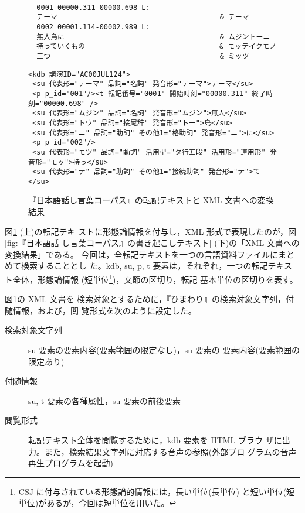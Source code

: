 \begin{figure}[hbt]

{\small
\begin{verbatim}
  
  0001 00000.311-00000.698 L:
  テーマ　　　　                                & テーマ
  0002 00001.114-00002.989 L:
  無人島に　　　                                & ムジントーニ
  持っていくもの                                & モッテイクモノ
  三つ　　　　　                                & ミッツ
\end{verbatim}}

{\small
\begin{verbatim}
<kdb 講演ID="AC00JUL124">
 <su 代表形="テーマ" 品詞="名詞" 発音形="テーマ">テーマ</su>
 <p p_id="001"/><t 転記番号="0001" 開始時刻="00000.311" 終了時刻="00000.698" />
 <su 代表形="ムジン" 品詞="名詞" 発音形="ムジン">無人</su>
 <su 代表形="トウ" 品詞="接尾辞" 発音形="トー">島</su>
 <su 代表形="ニ" 品詞="助詞" その他1="格助詞" 発音形="ニ">に</su>
 <p p_id="002"/>
 <su 代表形="モツ" 品詞="動詞" 活用型="タ行五段" 活用形="連用形" 発音形="モッ">持っ</su>
 <su 代表形="テ" 品詞="助詞" その他1="接続助詞" 発音形="テ">て</su>
\end{verbatim}}
\caption{『日本語話し言葉コーパス』の転記テキストと XML 文書への変換結果}
\label{fig:『日本語話し言葉コーパス』の書き起こしテキスト}
\end{figure}


図\ref{fig:『日本語話し言葉コーパス』の書き起こしテキスト} (上)の転記テキ
ストに形態論情報を付与し，XML 形式で表現したのが，図\ref{fig:『日本語話
し言葉コーパス』の書き起こしテキスト} (下)の「XML 文書への変換結果」である。
今回は，全転記テキストを一つの言語資料ファイルにまとめて検索することとし
た。kdb, su, p, t 要素は，それぞれ，一つの転記テキスト全体，形態論情報
(短単位\footnote{CSJ に付与されている形態論的情報には，長い単位(長単位)
と短い単位(短単位)があるが，今回は短単位を用いた。})，文節の区切り，転記
基本単位の区切りを表す。

図\ref{fig:『日本語話し言葉コーパス』の書き起こしテキスト}の XML 文書を
検索対象とするために，『ひまわり』の検索対象文字列，付随情報，および，閲
覧形式を次のように設定した。

\begin{description}
 \item[検索対象文字列] su 要素の要素内容(要素範囲の限定なし)，su 要素の
	    要素内容(要素範囲の限定あり)
 \item[付随情報] su,  t 要素の各種属性，su 要素の前後要素
 \item[閲覧形式] 転記テキスト全体を閲覧するために，kdb 要素を HTML ブラウ
	    ザに出力。また，検索結果文字列に対応する音声の参照(外部プロ
	    グラムの音声再生プログラムを起動)
\end{description}

